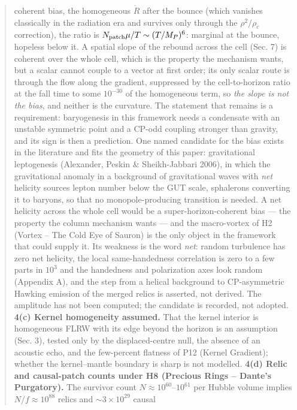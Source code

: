 \documentclass[
  11pt,
]{article}
\begin{document}
\begin{quote}
\begin{enumerate}
  coherent bias, the homogeneous \(\dot R\) after the bounce (which
  vanishes classically in the radiation era and survives only through
  the \(\rho^2/\rho_c\) correction), the ratio is
  \(N_{\rm patch}\mu/T \sim (T/M_P)^6\): marginal at the bounce,
  hopeless below it. A spatial slope of the rebound across the cell
  (Sec. 7) is coherent over the whole cell, which is the property the
  mechanism wants, but a scalar cannot couple to a vector at first
  order; its only scalar route is through the flow along the gradient,
  suppressed by the cell-to-horizon ratio at the fall time to some
  \(10^{-30}\) of the homogeneous term, so \emph{the slope is not the
  bias}, and neither is the curvature. The statement that remains is a
  requirement: baryogenesis in this framework needs a condensate with an
  unstable symmetric point and a CP-odd coupling stronger than gravity,
  and its sign is then a prediction. One named candidate for the bias
  exists in the literature and fits the geometry of this paper:
  gravitational leptogenesis (Alexander, Peskin \& Sheikh-Jabbari 2006),
  in which the gravitational anomaly in a background of gravitational
  waves with \emph{net} helicity sources lepton number below the GUT
  scale, sphalerons converting it to baryons, so that no
  monopole-producing transition is needed. A net helicity across the
  whole cell would be a super-horizon-coherent bias --- the property the
  column mechanism wants --- and the macro-vortex of H2 (Vortex -- The
  Cold Eye of Sauron) is the only object in the framework that could
  supply it. Its weakness is the word \emph{net}: random turbulence has
  zero net helicity, the local same-handedness correlation is zero to a
  few parts in \(10^3\) and the handedness and polarization axes look
  random (Appendix A), and the step from a helical background to
  CP-asymmetric Hawking emission of the merged relics is asserted, not
  derived. The amplitude has not been computed; the candidate is
  recorded, not adopted. \textbf{4(c) Kernel homogeneity assumed.} That
  the kernel interior is homogeneous FLRW with its edge beyond the
  horizon is an assumption (Sec. 3), tested only by the displaced-centre
  null, the absence of an acoustic echo, and the few-percent flatness of
  P12 (Kernel Gradient); whether the kernel--mantle boundary is sharp is
  not modelled. \textbf{4(d) Relic and causal-patch counts under H8
  (Precious Rings -- Dante's Purgatory).} The survivor count
  \(N \approx 10^{60}\)--\(10^{61}\) per Hubble volume implies
  \(N/f \approx 10^{88}\) relics and \(\sim\!3\times10^{29}\) causal

\end{enumerate}
\end{quote}
\end{document}
